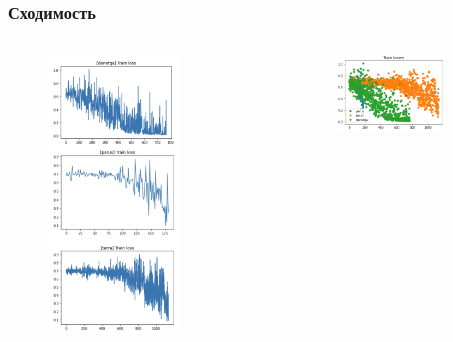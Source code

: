 \documentclass[aspectratio=169]{beamer}
\begin{document}
\begin{frame}
	\frametitle{Сходимость}
	\begin{columns}
		\begin{column}{0.3\textwidth}
			\begin{figure}
	       		\includegraphics[width=0.7\textwidth]{assets/ttl.png}
	    	\end{figure}
		\end{column}
		\begin{column}{0.7\textwidth}
			\begin{figure}
	       		\includegraphics[width=0.8\textwidth]{assets/conv_scatter.png}

\end{figure}
\end{column}
\end{columns}
\end{frame}
\end{document}
